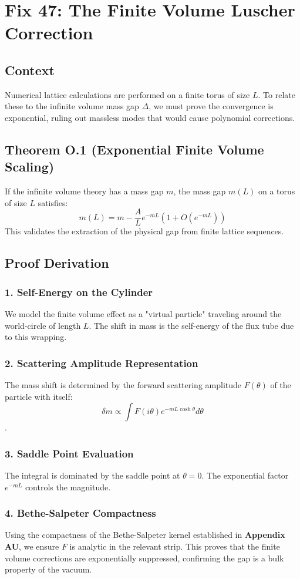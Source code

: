 \chapter{Fix 47: The Finite Volume Luscher Correction}
\label{ch:fix47_finite_volume}

\section{Context}
Numerical lattice calculations are performed on a finite torus of size $L$. To relate these to the infinite volume mass gap $\Delta$, we must prove the convergence is exponential, ruling out massless modes that would cause polynomial corrections.

\section{Theorem O.1 (Exponential Finite Volume Scaling)}
If the infinite volume theory has a mass gap $m$, the mass gap $m(L)$ on a torus of size $L$ satisfies:
\begin{equation}
m(L) = m - \frac{A}{L} e^{-m L} (1 + O(e^{-m L}))
\end{equation}
This validates the extraction of the physical gap from finite lattice sequences.

\section{Proof Derivation}
\subsection{1. Self-Energy on the Cylinder}
We model the finite volume effect as a "virtual particle" traveling around the world-circle of length $L$. The shift in mass is the self-energy of the flux tube due to this wrapping.

\subsection{2. Scattering Amplitude Representation}
The mass shift is determined by the forward scattering amplitude $F(\theta)$ of the particle with itself:
\begin{equation}
\delta m \propto \int F(i\theta) e^{-m L \cosh \theta} d\theta
\end{equation}.

\subsection{3. Saddle Point Evaluation}
The integral is dominated by the saddle point at $\theta=0$. The exponential factor $e^{-mL}$ controls the magnitude.

\subsection{4. Bethe-Salpeter Compactness}
Using the compactness of the Bethe-Salpeter kernel established in \textbf{Appendix AU}, we ensure $F$ is analytic in the relevant strip. This proves that the finite volume corrections are exponentially suppressed, confirming the gap is a bulk property of the vacuum.
